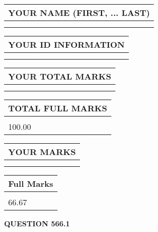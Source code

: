 \documentclass{ctexart}
\begin{document}
   
   
   
\newpage 
\setcounter{page}{ 
   566001 } 
   
   
   
   
\noindent\begin{tabular}{|l|}
\hline
YOUR NAME (FIRST, ... LAST)  \\
\hline
 \\ 
 \\ 
\hline
\end{tabular}
\hspace{0.05in} \begin{tabular}{|l|}
\hline
 YOUR   ID   INFORMATION  \\
\hline
 \\ 
 \\ 
\hline
\end{tabular}
   
   
\vspace{0.2in}\noindent\begin{tabular}{|l|}
\hline
YOUR TOTAL MARKS  \\
\hline
 \\ 
 \\ 
\hline
\end{tabular}
\hspace{0.05in} \begin{tabular}{|l|}
\hline
TOTAL FULL MARKS  \\
\hline
 \\ 
100.00 \\
\hline
\end{tabular}
   
   
 \vspace{0.2in}
 
 
 
 
   
   
  
\vspace{0.2in}
  
\noindent\begin{tabular}{|l|}
\hline
 YOUR MARKS  \\
\hline
 \\ 
 \\ 
\hline
\end{tabular}
\hspace{0.05in} \begin{tabular}{|l|}
\hline
 Full Marks  \\
\hline
 \\ 
66.67 \\
\hline
\end{tabular}
{\textbf{\Large{QUESTION
566.1 
}}}
  
\end{document}
